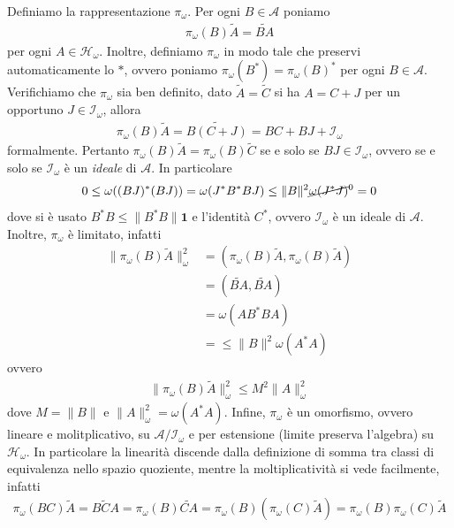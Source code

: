 \documentclass{article}
\numberwithin{equation}{subsection}
\begin{document}
Definiamo la rappresentazione $\pi_\omega$. Per ogni $B \in \mathscr{A}$ poniamo
\begin{align*}
    \pi_\omega(B)\widetilde{A} = \widetilde{BA}
\end{align*} 
per ogni $A \in \mathcal{H}_\omega$. Inoltre, definiamo $\pi_\omega$ in modo tale che preservi automaticamente lo $*$, ovvero poniamo $\pi_\omega(B^*) = \pi_\omega(B)^*$ per ogni $B \in \mathscr{A}$. \\
Verifichiamo che $\pi_\omega$ sia ben definito, dato $\widetilde{A} = \widetilde{C}$ si ha $A = C + J$ per un opportuno $J \in \mathscr{I}_\omega$, allora
\begin{align*}
    \pi_\omega(B)\widetilde{A} = \widetilde{B(C + J)} = BC + BJ + \mathscr{I}_\omega
\end{align*}
formalmente. Pertanto $\pi_\omega(B)\widetilde{A} = \pi_\omega(B)\widetilde{C}$ se e solo se $BJ \in \mathscr{I}_\omega$, ovvero se e solo se $\mathscr{I}_\omega$ è un \textit{ideale} di $\mathscr{A}$. In particolare
\begin{align*}
    0 \leq \omega((BJ)^*(BJ)) = \omega(J^*B^*BJ) \leq \|B\|^2\cancel{\omega(J^*J)}^{0} = 0
\end{align*}
dove si è usato $B^*B \leq \|B^*B\|\mathbf{1}$ e l'identità $C^*$, ovvero $\mathscr{I}_\omega$ è un ideale di $\mathscr{A}$. Inoltre, $\pi_\omega$ è limitato, infatti
\begin{align*}
    \|\pi_\omega(B)\widetilde{A}\|^2_\omega &= (\pi_\omega(B)\widetilde{A}, \pi_\omega(B)\widetilde{A}) \\
    &= (\widetilde{BA}, \widetilde{BA}) \\
    &= \omega(AB^*BA) \\
    &= \leq \|B\|^2\omega(A^*A)
\end{align*}
ovvero
\begin{align*}
    \|\pi_\omega(B)\widetilde{A}\|^2_\omega \leq M^2\|A\|^2_\omega
\end{align*}
dove $M = \|B\|$ e $\|A\|^2_\omega = \omega(A^*A)$. Infine, $\pi_\omega$ è un omorfismo, ovvero lineare e molitplicativo, su $\mathscr{A}/\mathscr{I}_\omega$ e per estensione (limite preserva l'algebra) su $\mathcal{H}_\omega$. In particolare la linearità discende dalla definizione di somma tra classi di equivalenza nello spazio quoziente, mentre la moltiplicatività si vede facilmente, infatti
\begin{align*}
    \pi_\omega(BC)\widetilde{A} = \widetilde{BCA} = \pi_\omega(B)\widetilde{CA} = \pi_\omega(B)(\pi_\omega(C)\widetilde{A}) = \pi_\omega(B)\pi_\omega(C)\widetilde{A}
\end{align*}
\end{document}

